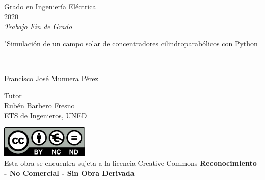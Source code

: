 \documentclass[12pt]{report} %
\begin{document}
	
	\begin{titlepage}
		\begin{sffamily}
			\color{azulUC3M}
			\begin{center}
				\begin{figure}[H] %
				\end{figure}
				\vspace{2.5cm}
				\begin{Large}
					Grado en Ingeniería Eléctrica\\			
					2020\\
					\vspace{2cm}		
					\textsl{Trabajo Fin de Grado}
					\bigskip
					
				\end{Large}
				{\Huge "Simulación de un campo solar de concentradores cilindroparabólicos con Python}\\
				\vspace*{0.5cm}
				\rule{10.5cm}{0.1mm}\\
				\vspace*{0.9cm}
				{\LARGE Francisco José Munuera Pérez}\\ 
				\vspace*{1cm}
				\begin{Large}
					Tutor\\
					Rubén Barbero Fresno\\
					ETS de Ingenieros, UNED\\
				\end{Large}
			\end{center}
			\vfill
			\color{black}
			\includegraphics[width=4.2cm]{images/creativecommons.png}\\ %
			Esta obra se encuentra sujeta a la licencia Creative Commons \textbf{Reconocimiento - No Comercial - Sin Obra Derivada}
		\end{sffamily}
	\end{titlepage}
	
\end{document}
